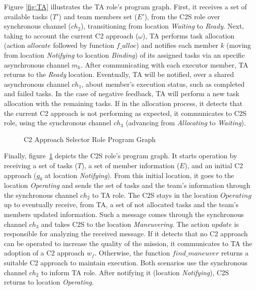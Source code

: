 Figure \ref{fig:TA} illustrates the TA role's program graph. First, it receives a set of available tasks ($T'$) and team members set ($E'$), from the C2S role over synchronous channel ($ch_2$), transitioning from location \textit{Waiting} to \textit{Ready}. Next, taking to account the current C2 approach ($\omega$), TA performs task allocation (action $allocate$ followed by function $f\_alloc$) and notifies each member $k$ (moving from location \textit{Notifying} to location \textit{Binding}) of its assigned tasks via an specific asynchronous channel $m_k$. After communicating with each executor member, TA returns to the \textit{Ready} location. Eventually, TA will be notified, over a shared asynchronous channel $ch_1$, about member's execution status, such as completed and failed tasks. In the case of negative feedback, TA will perform a new task allocation with the remaining tasks. If in the allocation process, it detects that the current C2 approach is not performing as expected, it communicates to C2S role, using the synchronous channel $ch_3$ (advancing from \textit{Allocating} to \textit{Waiting}).

\begin{figure}[!ht]
    \centering
    \scalebox{.65}{}
    \caption{C2 Approach Selector Role Program Graph}
    \label{fig:C2S}
\end{figure}

Finally, figure~\ref{fig:C2S} depicts the C2S role's program graph. It starts operation by receiving a set of tasks ($T$), a set of member information ($E$), and an initial C2 approach ($g_0$ at location \textit{Notifying}). From this initial location, it goes to the location \textit{Operating} and sends the set of tasks and the team's information through the synchronous channel $ch_2$ to TA role. The C2S stays in the location $Operating$ up to eventually receive, from TA, a set of not allocated tasks and the team's members updated information. Such a message comes through the synchronous channel $ch_3$ and takes C2S to the location \textit{Maneuvering}. The action $update$ is responsible for analyzing the received message. If it detects that no C2 approach can be operated to increase the quality of the mission, it communicates to TA the adoption of a C2 approach $w_f$. Otherwise, the function $find\_maneuver$ returns a suitable C2 approach to maintain execution. Both scenarios use the synchronous channel $ch_2$ to inform TA role. After notifying it (location \textit{Notifying}), C2S returns to location \textit{Operating}.


